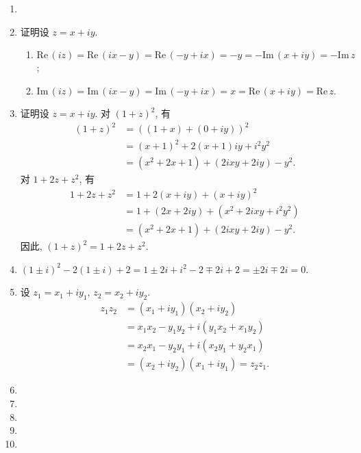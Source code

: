 \documentclass[a4paper, 11pt]{ctexart}
\newcommand{\re}{\mathrm{Re}\,}
\newcommand{\im}{\mathrm{Im}\,}
\begin{document}
\pagestyle{empty}
\begin{enumerate}
    \item %
    \item %
        {\heiti 证明}\quad 设 $z = x + iy$.
        \begin{enumerate}
            \item %
                $\re(iz) = \re(ix - y) = \re(-y + ix) = -y = -\im(x + iy) = -\im z$;
            \item %
                $\im(iz) = \im(ix - y) = \im(-y + ix) = x = \re(x + iy) = \re z$.
        \end{enumerate}
    \item %
        {\heiti 证明}\quad 设 $z = x + iy$. 对 $(1 + z)^2$, 有
        \begin{align*}
            (1 + z)^2 &= ((1+x) + (0+iy))^2 \\
                      &= (x+1)^2 + 2(x+1)iy + i^2y^2 \\
                      &= (x^2 + 2x + 1) + (2ixy + 2iy) - y^2.
        \end{align*}
        对 $1 + 2z + z^2$, 有
        \begin{align*}
            1 + 2z + z^2 &= 1 + 2(x + iy) + (x + iy)^2 \\
                         &= 1 + (2x + 2iy) + (x^2 + 2ixy + i^2y^2) \\
                         &= (x^2 + 2x + 1) + (2ixy + 2iy) - y^2.
        \end{align*}
        因此, $(1 + z)^2 = 1 + 2z + z^2$.
    \item %
        $(1 \pm i)^2 - 2(1 \pm i) + 2 = 1 \pm 2i + i^2 - 2 \mp 2i + 2 = \pm2i \mp 2i = 0$.
    \item %
        设 $z_1 = x_1 + iy_1$, $z_2 = x_2 + iy_2$.
        \begin{align*}
            z_1z_2 &= (x_1 + iy_1)(x_2 + iy_2) \\
                   &= x_1x_2 - y_1y_2 + i(y_1x_2 + x_1y_2) \\
                   &= x_2x_1 - y_2y_1 + i(x_2y_1 + y_2x_1) \\
                   &= (x_2 + iy_2)(x_1 + iy_1) = z_2z_1.
        \end{align*}
    \item %
    \item %
    \item %
    \item %
    \item %
\end{enumerate}
\end{document}
